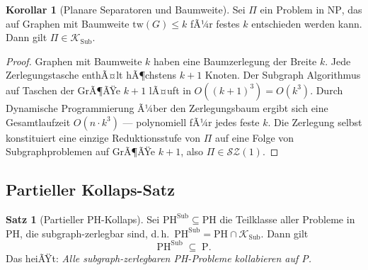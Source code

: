 ﻿\documentclass[a4paper,12pt]{article}
\theoremstyle{definition}
\newtheorem{satz}{Satz}
\newtheorem{korollar}{Korollar}
\begin{document}
\begin{korollar}[Planare Separatoren und Baumweite]
\label{kor:baumweite}
  Sei $\Pi$ ein Problem in $\mathrm{NP}$, das auf Graphen mit Baumweite
  $\mathrm{tw}(G) \leq k$ fÃ¼r festes $k$ entschieden werden kann.
  Dann gilt $\Pi \in \mathcal{K}_\mathrm{Sub}$.
\end{korollar}

\begin{proof}
  Graphen mit Baumweite $k$ haben eine Baumzerlegung der Breite $k$.
  Jede Zerlegungstasche enthÃ¤lt hÃ¶chstens $k+1$ Knoten.
  Der Subgraph Algorithmus auf Taschen der GrÃ¶ÃŸe $k+1$ lÃ¤uft in $O((k+1)^3) = O(k^3)$.
  Durch Dynamische Programmierung Ã¼ber den Zerlegungsbaum ergibt sich eine
  Gesamtlaufzeit $O(n \cdot k^3)$ --- polynomiell fÃ¼r jedes feste $k$.
  Die Zerlegung selbst konstituiert eine einzige Reduktionsstufe
  von $\Pi$ auf eine Folge von Subgraphproblemen auf GrÃ¶ÃŸe $k+1$,
  also $\Pi \in \mathcal{SZ}(1)$.
\end{proof}

\subsection{Partieller Kollaps-Satz}

\begin{satz}[Partieller PH-Kollaps]
\label{satz:kollaps}
  Sei $\mathrm{PH}^{\mathrm{Sub}} \subseteq \mathrm{PH}$ die Teilklasse aller
  Probleme in $\mathrm{PH}$, die subgraph-zerlegbar sind, d.\,h.\
  $\mathrm{PH}^{\mathrm{Sub}} = \mathrm{PH} \cap \mathcal{K}_\mathrm{Sub}$.
  Dann gilt
  \[
    \mathrm{PH}^{\mathrm{Sub}} \;\subseteq\; \mathrm{P}.
  \]
  Das heiÃŸt: \emph{Alle subgraph-zerlegbaren PH-Probleme kollabieren auf P.}
\end{satz}
\end{document}
